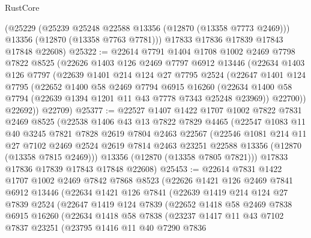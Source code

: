\begin{lexlean}{RustCore}
\begin{coremodule}
      (@25229
        (@25239 @25248 @22588 @13356 (@12870 (@13358 @7773 @2469)))
        @13356
        (@12870 (@13358 @7763 @7781)))
      @17833
      @17836
      @17839
      @17843
      @17848
      @22608)
@25322 := @22614
    @7791
    @1404
    @1708
    @1002
    @2469
    @7798
    @7822
    @8525
    (@22626
      @1403
      @126
      @2469
      @7797
      @6912
      @13446
      (@22634
        @1403
        @126
        @7797
        (@22639
          @1401
          @214
          @124
          @27
          @7795
          @2524
          (@22647
            @1401
            @124
            @7795
            (@22652
              @1400
              @58
              @2469
              @7794
              @6915
              @16260
              (@22634 @1400 @58 @7794 (@22639 @1394 @1201 @11 @43 @7778 @7343 @25248 @23969))
              @22700))
          @22692))
      @22709)
@25377 := @22527
    @1407
    @1422
    @1707
    @1002
    @7822
    @7831
    @2469
    @8525
    (@22538
      @1406
      @43
      @13
      @7822
      @7829
      @4465
      (@22547
        @1083
        @11
        @40
        @3245
        @7821
        @7828
        @2619
        @7804
        @2463
        @22567
        (@22546
          @1081
          @214
          @11
          @27
          @7102
          @2469
          @2524
          @2619
          @7814
          @2463
          @23251
          @22588
          @13356
          (@12870 (@13358 @7815 @2469)))
        @13356
        (@12870 (@13358 @7805 @7821)))
      @17833
      @17836
      @17839
      @17843
      @17848
      @22608)
@25453 := @22614
    @7831
    @1422
    @1707
    @1002
    @2469
    @7842
    @7868
    @8523
    (@22626
      @1421
      @126
      @2469
      @7841
      @6912
      @13446
      (@22634
        @1421
        @126
        @7841
        (@22639
          @1419
          @214
          @124
          @27
          @7839
          @2524
          (@22647
            @1419
            @124
            @7839
            (@22652
              @1418
              @58
              @2469
              @7838
              @6915
              @16260
              (@22634
                @1418
                @58
                @7838
                (@23237
                  @1417
                  @11
                  @43
                  @7102
                  @7837
                  @23251
                  (@23795
                    @1416
                    @11
                    @40
                    @7290
                    @7836

\end{coremodule}
\end{lexlean}
